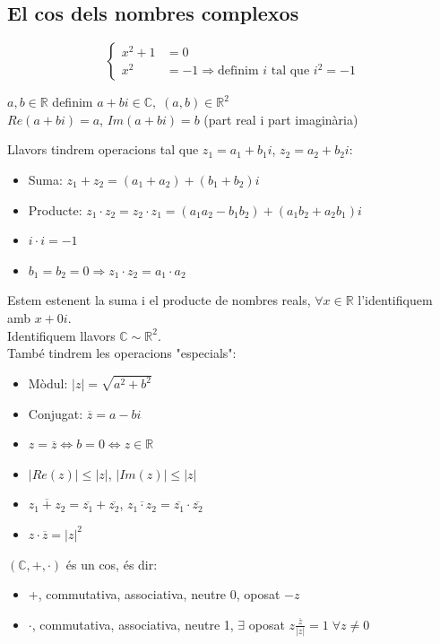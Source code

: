 \documentclass[../main.tex]{subfiles}
\begin{document}
\subsection{El cos dels nombres complexos}
\begin{displaymath}
\begin{cases}
x^2 + 1 &= 0\\
x^2 &= -1 \Rightarrow \text{definim } i \text{ tal que }i^2 = -1
\end{cases}
\end{displaymath}
\begin{definicio}
    $a, b \in \mathbb{R}$ definim $a + bi \in \mathbb{C},\;(a,b) \in \mathbb{R}^2$\\
    $Re(a+bi) = a$, $Im(a+bi) = b$ (part real i part imaginària)
\end{definicio}
Llavors tindrem operacions tal que $z_1 = a_1 + b_1i$, $z_2 = a_2 + b_2i$:
\begin{itemize}
	\item Suma: $z_1 + z_2 = (a_1 + a_2) + (b_1 + b_2)i$
	\item Producte: $z_1 \cdot z_2  = z_2 \cdot z_1 = (a_1a_2 - b_1b_2) + (a_1b_2 + a_2b_1)i$
\end{itemize}
\begin{obs}
	\begin{itemize}
		\item $i \cdot i = -1$
		\item $b_1 = b_2 = 0 \Rightarrow z_1\cdot z_2 = a_1 \cdot a_2$
	\end{itemize}
\end{obs}
Estem estenent la suma i el producte de nombres reals, $\forall x \in \mathbb{R}$ l'identifiquem amb $x + 0i$.\\
Identifiquem llavors $\mathbb{C} \sim \mathbb{R}^2$.\\
També tindrem les operacions "especials":
\begin{itemize}
	\item Mòdul: $|z| = \sqrt{a^2 + b^2}$
	\item Conjugat: $\overline{z} = a - bi$
\end{itemize}
\begin{obs}
	\begin{itemize}
		\item $z = \overline{z} \iff b = 0 \iff z \in \mathbb{R}$
		\item $|Re(z)| \leq |z|$, $|Im(z)| \leq |z|$
		\item $\overline{z_1 + z_2} = \overline{z_1} + \overline{z_2}$, $\overline{z_1 \cdot z_2} = \overline{z_1} \cdot \overline{z_2}$
		\item $z \cdot \overline{z} = |z|^2$
	\end{itemize}
\end{obs}
$(\mathbb{C}, +, \cdot)$ és un cos, és dir:
\begin{itemize}
	\item +, commutativa, associativa, neutre 0, oposat $-z$
	\item $\cdot$, commutativa, associativa, neutre 1, $\exists$ oposat $z \frac{\overline{z}}{|z|} = 1\;\forall z \neq 0$
\end{itemize}
\end{document}
